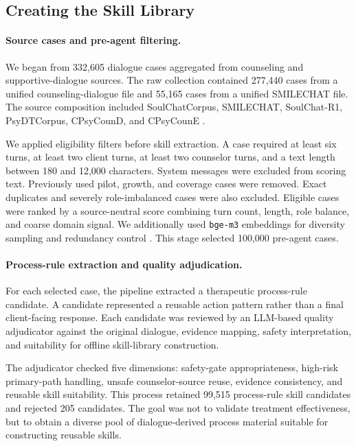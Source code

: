 \documentclass[11pt]{article}
\begin{document}
\subsection{Creating the Skill Library}

\paragraph{Source cases and pre-agent filtering.}
We began from 332,605 dialogue cases aggregated from counseling and supportive-dialogue sources. The raw collection contained 277,440 cases from a unified counseling-dialogue file and 55,165 cases from a unified SMILECHAT file. The source composition included SoulChatCorpus, SMILECHAT, SoulChat-R1, PsyDTCorpus, CPsyCounD, and CPsyCounE \citep{chen2023soulchat,qiu2024smile,zhang2024cpsycoun,xie2025psydt}.

We applied eligibility filters before skill extraction. A case required at least six turns, at least two client turns, at least two counselor turns, and a text length between 180 and 12,000 characters. System messages were excluded from scoring text. Previously used pilot, growth, and coverage cases were removed. Exact duplicates and severely role-imbalanced cases were also excluded. Eligible cases were ranked by a source-neutral score combining turn count, length, role balance, and coarse domain signal. We additionally used \texttt{bge-m3} embeddings for diversity sampling and redundancy control \citep{chen2024bgem3}. This stage selected 100,000 pre-agent cases.

\paragraph{Process-rule extraction and quality adjudication.}
For each selected case, the pipeline extracted a therapeutic process-rule candidate. A candidate represented a reusable action pattern rather than a final client-facing response. Each candidate was reviewed by an LLM-based quality adjudicator against the original dialogue, evidence mapping, safety interpretation, and suitability for offline skill-library construction.

The adjudicator checked five dimensions: safety-gate appropriateness, high-risk primary-path handling, unsafe counselor-source reuse, evidence consistency, and reusable skill suitability. This process retained 99,515 process-rule skill candidates and rejected 205 candidates. The goal was not to validate treatment effectiveness, but to obtain a diverse pool of dialogue-derived process material suitable for constructing reusable skills.
\end{document}
